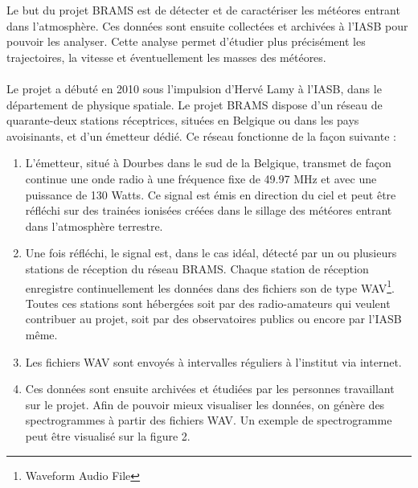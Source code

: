 \documentclass[11pt]{article}
\begin{document}
Le but du projet BRAMS est de détecter et de caractériser les météores entrant dans l'atmosphère.
Ces données sont ensuite collectées et archivées à l'IASB pour pouvoir les analyser.
Cette analyse permet d'étudier plus précisément les trajectoires, la vitesse et éventuellement les masses des météores.\\
\\
Le projet a débuté en 2010 sous l'impulsion d'Hervé Lamy à l'IASB, dans le département de physique spatiale.
Le projet BRAMS dispose d'un réseau de quarante-deux stations réceptrices, situées en Belgique ou dans les pays avoisinants, et d'un émetteur dédié.
Ce réseau fonctionne de la façon suivante :
\begin{enumerate}
    \item L'émetteur, situé à Dourbes dans le sud de la Belgique, transmet de façon continue une onde radio à une fréquence fixe de 49.97 MHz et avec une puissance de 130 Watts.
          Ce signal est émis en direction du ciel et peut être réfléchi sur des trainées ionisées créées dans le sillage des météores entrant dans l'atmosphère terrestre.
    \item Une fois réfléchi, le signal est, dans le cas idéal, détecté par un ou plusieurs stations de réception du réseau BRAMS.
          Chaque station de réception enregistre continuellement les données dans des fichiers son de type WAV\footnote{Waveform Audio File}.
          Toutes ces stations sont hébergées soit par des radio-amateurs qui veulent contribuer au projet, soit par des observatoires publics ou encore par l'IASB même.
    \item Les fichiers WAV sont envoyés à intervalles réguliers à l'institut via internet.
    \item Ces données sont ensuite archivées et étudiées par les personnes travaillant sur le projet.
          Afin de pouvoir mieux visualiser les données, on génère des spectrogrammes à partir des fichiers WAV.
          Un exemple de spectrogramme peut être visualisé sur la figure 2.
\end{enumerate}
\end{document}
